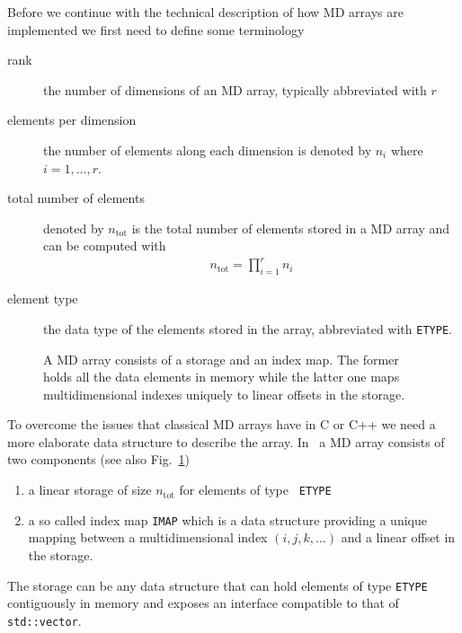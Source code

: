 Before we continue with the technical description of how MD arrays are
implemented we first need to define some terminology 
\begin{description}
\item[rank] the number of dimensions of an MD array, typically abbreviated with
$r$
\item[elements per dimension] the number of elements along each dimension is
denoted by $n_i$ where $i=1,\hdots,r$.
\item[total number of elements] denoted by $n_{\mathrm{tot}}$ is the total
number of elements stored in a MD array and can be computed with 
\begin{align}
    n_{\mathrm{tot}} = \prod_{i=1}^r n_i
\end{align}
\item[element type] the data type of the elements stored in the array,
abbreviated with {\tt ETYPE}. 
\end{description}

\begin{figure}[tb]
\centering
\begin{minipage}[c]{0.55\linewidth}
\centering
{}
\end{minipage}
\hfill
\begin{minipage}[c]{0.39\linewidth}
\caption{{\small\label{fig:array_app:basic_structure} A MD array consists of a
storage and an index map. The former holds all the data elements in memory while
the latter one maps multidimensional indexes uniquely to linear offsets in the
storage.
}}
\end{minipage}
\end{figure}
To overcome the issues that classical MD arrays have in C or C++ we need a more
elaborate data structure to describe the array. In \libpnicore\ a MD array
consists of two components (see also Fig.~\ref{fig:array_app:basic_structure})
\begin{enumerate}
\item a linear storage of size $n_{\mathrm{tot}}$ for elements of type {\tt
ETYPE}
\item a so called index map {\tt IMAP} which is a data structure providing a
unique mapping between a multidimensional index $(i,j,k,\hdots)$ and a linear
offset in the storage. 
\end{enumerate}
The storage can be any data structure that can hold elements of type {\tt ETYPE}
contiguously in memory and exposes an interface compatible to that of {\tt std::vector}.

